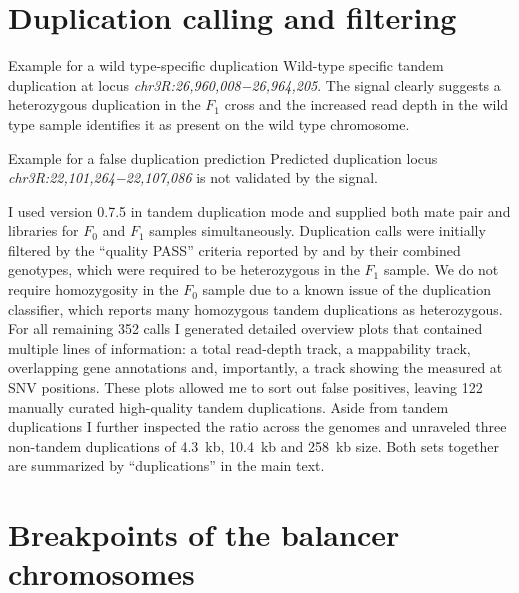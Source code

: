 \section{Duplication calling and filtering}
\label{sec:suppl_dup}

    {Example for a wild type-specific duplication}
    {Wild-type specific tandem duplication at locus
    \textit{chr3R:26,960,008−26,964,205}. The \baf signal
    clearly suggests a heterozygous duplication in the $F_1$ cross and the
    increased read depth in the wild type sample identifies it as present on
    the wild type chromosome.}

    {Example for a false duplication prediction}
    {Predicted duplication locus \textit{chr3R:22,101,264−22,107,086} is not
    validated by the \baf signal.}

I used \delly version 0.7.5 in tandem duplication mode and supplied both mate
pair and \wgs libraries for $F_0$ and $F_1$ samples simultaneously. Duplication
calls were initially filtered by the ``quality PASS'' criteria reported by
\delly and by their combined genotypes, which were required to be heterozygous
in the $F_1$ sample. We do not require homozygosity in the $F_0$ sample due to a
known issue of the duplication classifier, which reports many homozygous tandem
duplications as heterozygous. For all remaining 352 calls I generated detailed
overview plots that contained multiple lines of information: a total read-depth
track, a mappability track, overlapping gene annotations and, importantly, a
track showing the \baf measured at SNV positions. These plots
allowed me to sort out false positives, leaving 122 manually curated
high-quality tandem duplications. Aside from tandem duplications I further
inspected the \baf ratio across the genomes and unraveled three
non-tandem duplications of 4.3~kb, 10.4~kb and 258~kb size. Both sets together
are summarized by ``duplications'' in the main text.





\section{Breakpoints of the balancer chromosomes}
\label{sec:suppl_balancer_breakpoints}

